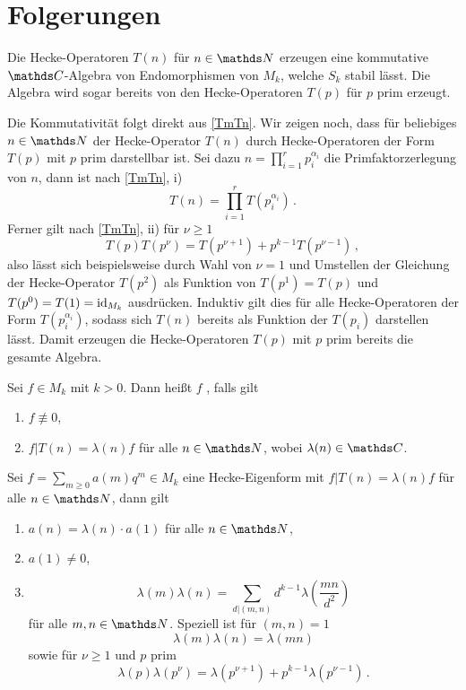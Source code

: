 \section{Folgerungen}

\begin{satz}
Die Hecke-Operatoren $T(n)$ für $n \in \NN$ erzeugen eine kommutative $\CC$-Algebra von Endomorphismen von $M_k$, welche $S_k$ stabil lässt. Die Algebra wird sogar bereits von den Hecke-Operatoren $T(p)$ für $p$ prim erzeugt.
\end{satz}

\begin{bewe}
Die Kommutativität folgt direkt aus \autoref{TmTn}. Wir zeigen noch, dass für beliebiges $n \in \NN$ der Hecke-Operator $T(n)$ durch Hecke-Operatoren der Form $T(p)$ mit $p$ prim darstellbar ist. Sei dazu $n = \prod_{i=1}^{r} p_i^{\alpha_i}$ die Primfaktorzerlegung von $n$, dann ist nach \autoref{TmTn}, i)
\[
T(n) = \prod_{i=1}^{r} T(p_i^{\alpha_i})
\,.
\]
Ferner gilt nach \autoref{TmTn}, ii) für $\nu \geq 1$
\[
T(p) T(p^\nu) = T(p^{\nu+1}) + p^{k-1} T(p^{\nu-1})
\,,
\]
also lässt sich beispielsweise durch Wahl von $\nu = 1$ und Umstellen der Gleichung der Hecke-Operator $T(p^2)$ als Funktion von $T(p^1) = T(p)$ und $T(p^0) = T(1) = \operatorname{id}_{M_k}$ ausdrücken. Induktiv gilt dies für alle Hecke-Operatoren der Form $T(p_i^{\alpha_i})$, sodass sich $T(n)$ bereits als Funktion der $T(p_i)$ darstellen lässt. Damit erzeugen die Hecke-Operatoren $T(p)$ mit $p$ prim bereits die gesamte Algebra.
\end{bewe}

\begin{defi}
Sei $f \in M_k$ mit $k > 0$. Dann heißt $f$ , falls gilt
\begin{enumerate}
\item $f \not \equiv 0$,
\item $f | T(n) = \lambda(n) f$ für alle $n \in \NN$, wobei $\lambda(n) \in \CC$.
\end{enumerate}
\end{defi}

\begin{satz}
Sei $f = \sum_{m \geq 0} a(m) q^m \in M_k$ eine Hecke-Eigenform mit $f | T(n) = \lambda(n) f$ für alle $n \in \NN$, dann gilt
\begin{enumerate}
\item $a(n) = \lambda(n) \cdot a(1)$ für alle $n \in \NN$,
\item $a(1) \neq 0$, 
\item \[
\lambda(m) \lambda(n) = \sum_{d \vert (m,n)} d^{k-1} \lambda \left( \frac {mn}{d^2} \right)
\]
für alle $m,n \in \NN$. Speziell ist für $(m, n) = 1$
\[
\lambda(m) \lambda(n) = \lambda(mn)
\]
sowie für $\nu \geq 1$ und $p$ prim
\[
\lambda(p) \lambda(p^\nu) = \lambda(p^{\nu+1}) + p^{k-1}\lambda(p^{\nu-1})
\,.
\]
\end{enumerate}
\end{satz}

